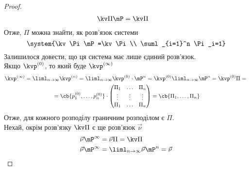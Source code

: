 \begin{proof}
\begin{eqnarray}
& \kv\Pi\mP=\kv\Pi
\end{eqnarray}
Отже, $\Pi$ можна знайти, як розв’язок системи 
\begin{equation}
\system{\kv\Pi\mP=\kv\Pi\\ \suml_{i=1}^n \Pi_i=1}
\end{equation}
Залишилося довести, що ця система має лише єдиний розв’язок.\\
Якщо $\kvp^{(0)}$, то який буде $\kvp^{(\infty)}$
\begin{multline}
\kvp^{(\infty)} = \liml_{n\to\infty} \kvp^{(n)} = \liml_{n\to\infty} \kvp^{(0)} \cdot \mP^n = \kvp^{(0)} \liml_{n\to\infty} \mP^n = \kvp^{(0)}\Pi ={} \\ {} = \cb{p_1^{(0)},\ldots,p_n^{(0)}} \cdot \begin{pmatrix}
\Pi_1 & \ldots & \Pi_n \\
\vdots & \vdots & \vdots \\
\Pi_1 & \ldots &\Pi_n
\end{pmatrix} = \cb{\Pi_1,\ldots,\Pi_n}
\end{multline}
Отже, для кожного розподілу граничним розподілом є $\Pi$.\\
Нехай, окрім розв’язку $\kv\Pi$ є ще розв’язок $\vec\nu$\\
\begin{eqnarray}
&\vec\nu\mP^{\infty} = \vec\nu \Pi = \kv\Pi\\
&\vec\nu\mP^{\infty} = \liml_{n\to\infty} \vec\nu \mP^n = \vec\nu
\end{eqnarray}
\end{proof}
